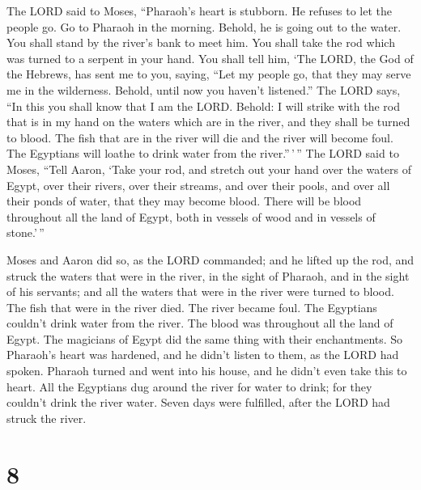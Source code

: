  The LORD said to Moses, ``Pharaoh's heart is stubborn. He
refuses to let the people go.  Go to Pharaoh in the
morning. Behold, he is going out to the water. You shall stand by the
river's bank to meet him. You shall take the rod which was turned to a
serpent in your hand.  You shall tell him, `The LORD, the
God of the Hebrews, has sent me to you, saying, ``Let my people go, that
they may serve me in the wilderness. Behold, until now you haven't
listened.''  The LORD says, ``In this you shall know that I
am the LORD. Behold: I will strike with the rod that is in my hand on
the waters which are in the river, and they shall be turned to blood.
 The fish that are in the river will die and the river will
become foul. The Egyptians will loathe to drink water from the
river.''\,'\,''  The LORD said to Moses, ``Tell Aaron,
`Take your rod, and stretch out your hand over the waters of Egypt, over
their rivers, over their streams, and over their pools, and over all
their ponds of water, that they may become blood. There will be blood
throughout all the land of Egypt, both in vessels of wood and in vessels
of stone.'\,''

 Moses and Aaron did so, as the LORD commanded; and he
lifted up the rod, and struck the waters that were in the river, in the
sight of Pharaoh, and in the sight of his servants; and all the waters
that were in the river were turned to blood.  The fish that
were in the river died. The river became foul. The Egyptians couldn't
drink water from the river. The blood was throughout all the land of
Egypt.  The magicians of Egypt did the same thing with
their enchantments. So Pharaoh's heart was hardened, and he didn't
listen to them, as the LORD had spoken.  Pharaoh turned and
went into his house, and he didn't even take this to heart.
 All the Egyptians dug around the river for water to drink;
for they couldn't drink the river water.  Seven days were
fulfilled, after the LORD had struck the river.

\hypertarget{section-7}{%
\section{8}\label{section-7}}

